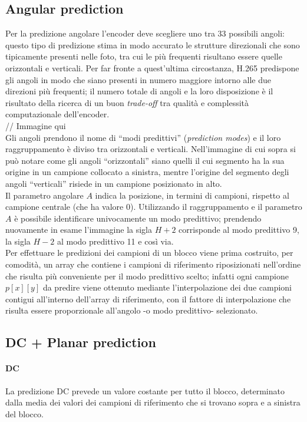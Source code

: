 \subsection{Angular prediction}
Per la predizione angolare l'encoder deve scegliere uno tra 33 possibili angoli:
 questo tipo di predizione stima in modo accurato le strutture direzionali che 
sono tipicamente presenti nelle foto, tra cui le più frequenti risultano essere
 quelle orizzontali e verticali.
Per far fronte a quest'ultima circostanza, H.265 predispone gli angoli in modo 
che siano presenti in numero maggiore intorno alle due direzioni più frequenti;
 il numero totale di angoli e la loro disposizione è il risultato della ricerca 
di un buon \emph{trade-off} tra qualità e complessità computazionale 
dell'encoder.
\\
// Immagine qui
\\
Gli angoli prendono il nome di ``modi predittivi'' (\emph{prediction modes}) e 
il loro raggruppamento è diviso tra orizzontali e verticali.
Nell'immagine di cui sopra si può notare come gli angoli ``orizzontali'' siano 
quelli il cui segmento ha la sua origine in un campione collocato a sinistra, 
mentre l'origine del segmento degli angoli ``verticali'' risiede in un campione 
posizionato in alto.\\
Il parametro angolare $A$ indica la posizione, in termini di campioni, rispetto 
al campione centrale (che ha valore $0$).
Utilizzando il raggruppamento e il parametro $A$ è possibile identificare 
univocamente un modo predittivo; prendendo nuovamente in esame l'immagine la 
sigla $H+2$ corrisponde al modo predittivo 9, la sigla $H-2$ al modo predittivo 
11 e così via.\\
Per effettuare le predizioni dei campioni di un blocco viene prima costruito, 
per comodità, un array che contiene i campioni di riferimento riposizionati 
nell'ordine che risulta più conveniente per il modo predittivo scelto; infatti 
ogni campione $p[x][y]$ da predire viene ottenuto mediante l'interpolazione dei 
due campioni contigui all'interno dell'array di riferimento, con il fattore di 
interpolazione che risulta essere proporzionale all'angolo -o modo predittivo- 
selezionato.

\subsection{DC + Planar prediction }
\paragraph*{DC} La predizione DC prevede un valore costante per tutto il 
blocco, determinato dalla media dei valori dei campioni di riferimento che si 
trovano sopra e a sinistra del blocco.

